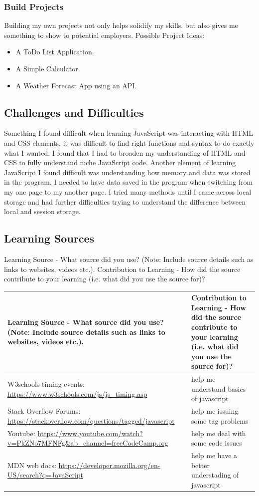 \documentclass[a4paper, 11pt]{report}
\begin{document}
\subsubsection{Build Projects}

Building my own projects not only helps solidify my skills, but also gives me something to show to potential employers.
Possible Project Ideas:
\begin{itemize}
\item	A ToDo List Application.
\item	A Simple Calculator.
\item	A Weather Forecast App using an API.
\end{itemize}

\subsection{Challenges and Difficulties}
Something I found difficult when learning JavaScript was interacting with HTML and CSS elements, it was difficult to find right functions and syntax to do exactly what I wanted. I found that I had to broaden my understanding of HTML and CSS to fully understand	niche	JavaScript	code. Another element of  learning  JavaScript  I  found  difficult  was understanding how memory and data was stored in the program. I needed to have data saved in the program when switching from my one page to my another page. I tried many methods until I came across local storage and had further difficulties trying to understand the difference between local and session storage.

\subsection{Learning Sources}
Learning Source - What source did you use? (Note: Include source details such as links to websites, videos etc.).	Contribution to Learning - How did the source contribute to your learning (i.e. what did you use the source for)?

\begin{tabular}{|p{}|p{}|}
	\hline
	Learning Source - What source did you use? (Note: Include source details such as links to websites, videos etc.). & Contribution to Learning - How did the source contribute to your learning (i.e. what did you use the source for)?\\
	\hline
	W3schools timing events: \url{https://www.w3schools.com/js/js_timing.asp} & help me understand basics of javascript\\
	\hline
	Stack Overflow Forums: \url{https://stackoverflow.com/questions/tagged/javascript} & help me issuing some tag problems\\
	\hline
	Youtube: \url{https://www.youtube.com/watch?v=PkZNo7MFNFg&ab_channel=freeCodeCamp.org} & help me deal with some code issues\\
	\hline
	MDN web docs: \url{https://developer.mozilla.org/en-US/search?q=JavaScript} & help me have a better understading of javascript\\

	\hline
\end{tabular}
\end{document}
